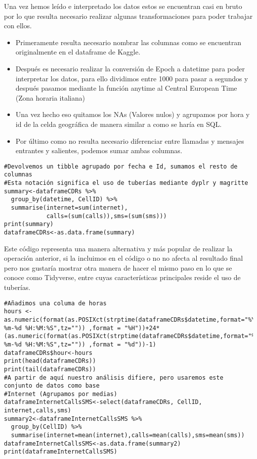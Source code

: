 \documentclass[11pt, a4paper]{article} %
\begin{document}
Una vez hemos leído e interpretado los datos estos se encuentran casi en bruto por lo que resulta necesario realizar algunas transformaciones para poder trabajar con ellos. 
\begin{itemize}
\item Primeramente resulta necesario nombrar las columnas como se encuentran originalmente en el dataframe de Kaggle.
\item Después es necesario realizar la conversión de Epoch a datetime para poder interpretar los datos, para ello dividimos entre 1000 para pasar a segundos y después pasamos mediante la función anytime al Central European Time (Zona horaria italiana)
\item Una vez hecho eso quitamos los NAs (Valores nulos) y agrupamos por hora y id de la celda geográfica de manera similar a como se haría en SQL.
\item Por último como no resulta necesario diferenciar entre llamadas y mensajes entrantes y salientes, podemos sumar ambas columnas.
\end{itemize}
\begin{lstlisting}
#Devolvemos un tibble agrupado por fecha e Id, sumamos el resto de columnas
#Esta notación significa el uso de tuberías mediante dyplr y magritte
summary<-dataframeCDRs %>%
  group_by(datetime, CellID) %>%
  summarise(internet=sum(internet),
            calls=(sum(calls)),sms=(sum(sms)))
print(summary)
dataframeCDRs<-as.data.frame(summary)
\end{lstlisting}
Este código representa una manera alternativa y más popular de realizar la operación anterior, si la incluimos en el código o no no afecta al resultado final pero nos gustaría mostrar otra manera de hacer el mismo paso en lo que se conoce como Tidyverse, entre cuyas características principales reside el uso de tuberías.
\begin{lstlisting}
#Añadimos una columa de horas
hours <- as.numeric(format(as.POSIXct(strptime(dataframeCDRs$datetime,format="%Y-%m-%d %H:%M:%S",tz="")) ,format = "%H"))+24*(as.numeric(format(as.POSIXct(strptime(dataframeCDRs$datetime,format="%Y-%m-%d %H:%M:%S",tz="")) ,format = "%d"))-1)
dataframeCDRs$hour<-hours
print(head(dataframeCDRs))
print(tail(dataframeCDRs))
#A partir de aquí nuestro análisis difiere, pero usaremos este conjunto de datos como base
#Internet (Agrupamos por medias)
dataframeInternetCallsSMS<-select(dataframeCDRs, CellID, internet,calls,sms)
summary2<-dataframeInternetCallsSMS %>%
  group_by(CellID) %>%
  summarise(internet=mean(internet),calls=mean(calls),sms=mean(sms))
dataframeInternetCallsSMS<-as.data.frame(summary2)
print(dataframeInternetCallsSMS)
\end{lstlisting}
\end{document}
